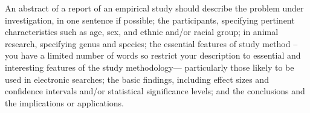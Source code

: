 An abstract of a report of an empirical study should describe the problem under investigation, in one sentence if possible; the participants, specifying pertinent characteristics such as age, sex, and ethnic and/or racial group; in animal research, specifying genus and species; the essential features of study method -- you have a limited number of words so restrict your description to essential and interesting features of the study methodology— particularly those likely to be used in electronic searches; the basic findings, including effect sizes and confidence intervals and/or statistical significance levels; and the conclusions and the implications or applications.